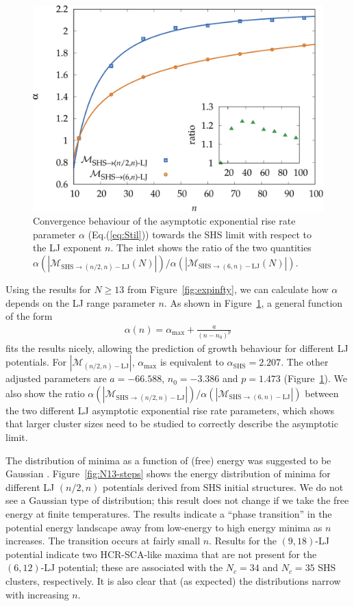 \begin{figure}
    \centering
    \includegraphics[width=0.8\columnwidth]{kslj/repulsive13-14.pdf}
    \caption{Convergence behaviour of the asymptotic exponential rise rate
    parameter $\alpha$ (Eq.(\ref{eq:Stil})) towards the \acs{SHS} limit with
    respect to the \acs{LJ} exponent $n$. The inlet shows the ratio of the two
    quantities $\alpha(|\mathcal{M}_{\text{SHS}\to (n/2,n)-\text{LJ}}(N)|)
    / \alpha(|\mathcal{M}_{\text{SHS}\to (6,n)-\text{LJ}}(N)|)$.}
    \label{fig:repulsive13-14}
\end{figure}


Using the results for $N \geq 13$ 
from Figure~\ref{fig:expinfty}, we can calculate how $\alpha$ depends on the LJ range parameter $n$.
As shown in Figure~\ref{fig:repulsive13-14}, a general function of the form
\begin{align}
\label{expgrowth}
    \alpha(n)=\alpha_\text{max}+\frac{a}{(n-n_0)^{p}}
\end{align}
fits the results nicely, allowing the prediction of growth behaviour for different
LJ potentials. For $|\mathcal{M}_{(n/2,n)-\text{LJ}}|$, $\alpha_\text{max}$ is
equivalent to $\alpha_\text{SHS}=2.207$. The other adjusted parameters are
$a=-66.588$, $n_0=-3.386$ and $p=1.473$ (Figure~\ref{fig:repulsive13-14}).
We also show the ratio $\alpha(|\mathcal{M}_{\text{SHS}\to (n/2,n)-\text{LJ}}|) /
	\alpha(|\mathcal{M}_{\text{SHS}\to (6,n)-\text{LJ}}|)$ between the two 
	different LJ asymptotic exponential rise rate parameters, which shows that larger
	cluster sizes need to be studied to correctly describe the asymptotic limit. 


The distribution of minima as a function of (free) energy was suggested to be
Gaussian \autocite{Sciortino-1999}.  Figure~\ref{fig:N13-steps} shows the energy
distribution of minima for different LJ $(n/2,n)$ potentials derived from \ac{SHS}
initial structures. We do not see a Gaussian type of distribution; this 
result does not change if we take the free energy at finite temperatures. 
The results indicate a ``phase transition'' in the potential energy landscape away from low-energy to
high energy minima as $n$ increases.
The transition occurs at fairly small $n$. 
Results for the $(9,18)$-LJ potential indicate two HCR-SCA-like maxima that are not present for the $(6,12)$-LJ potential; these are associated with the $N_c = 34$ and $N_c = 35$ \ac{SHS} clusters,
respectively.
It is also clear that (as expected) the distributions narrow with increasing $n$.

